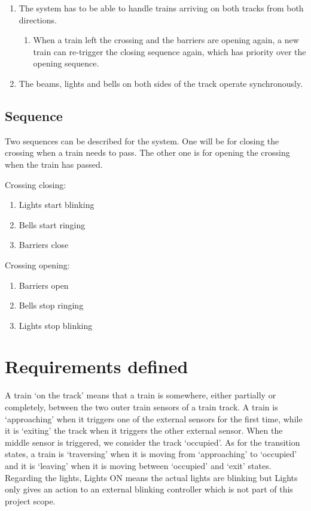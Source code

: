 \documentclass[final]{report}
\begin{document}
\begin{enumerate}
\item The system has to be able to handle trains arriving on both tracks from both directions.
	\begin{enumerate}
	\item When a train left the crossing and the barriers are opening again, a new train can re-trigger the closing sequence again, which has priority over the opening sequence.
	\end{enumerate}

\item The beams, lights and bells on both sides of the track operate synchronously.
\end{enumerate}


\subsection{Sequence}
Two sequences can be described for the system.
One will be for closing the crossing when a train needs to pass. The other one is for opening the crossing when the train has passed.

Crossing closing:
\begin{enumerate}
\item Lights start blinking
\item Bells start ringing
\item Barriers close
\end{enumerate}

Crossing opening:
\begin{enumerate}
\item Barriers open
\item Bells stop ringing
\item Lights stop blinking
\end{enumerate}

\section{Requirements defined}
A train `on the track' means that a train is somewhere, either partially or completely, between the two outer train sensors of a train track.
A train is `approaching' when it triggers one of the external sensors for the first time, while it is `exiting' the track when it triggers the other external sensor.
When the middle sensor is triggered, we consider the track `occupied'.
As for the transition states, a train is `traversing' when it is moving from `approaching' to `occupied' and it is `leaving' when it is moving between `occupied' and `exit' states.\\
Regarding the lights, Lights ON means the actual lights are blinking but Lights only gives an action to an external blinking controller which is not part of this project scope.
\end{document}
